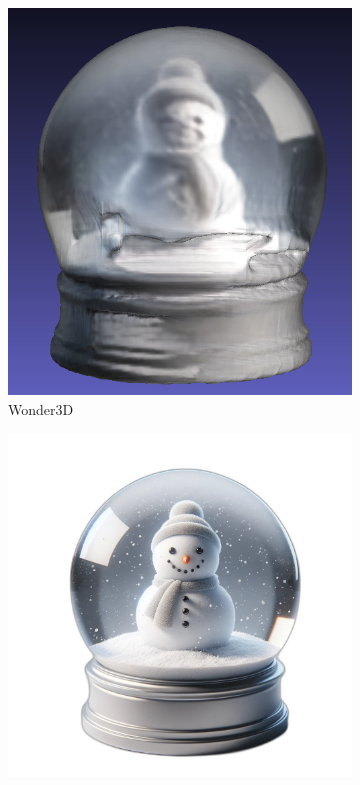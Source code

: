\begin{figure}[ht]
\begin{subfigure}[b]{0.27\textwidth}
        \includegraphics[width=\textwidth]{figures/subjective/wonder3d_globe_result.png}
        \caption{Wonder3D}
        \vspace{0.1cm}
    \end{subfigure}
    \begin{subfigure}[b]{0.32\textwidth}
        \centering
        \includegraphics[width=\textwidth]{figures/input/snowGlobe.png}

\end{subfigure}
\end{figure}
